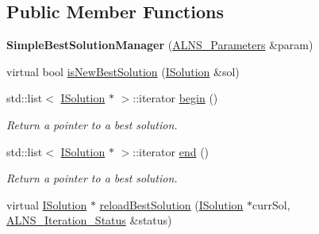 \subsection*{\-Public \-Member \-Functions}
\begin{DoxyCompactItemize}
\item 
\hypertarget{classSimpleBestSolutionManager_a776c41f8abf2720ecbdfea78d88b0f00}{{\bfseries \-Simple\-Best\-Solution\-Manager} (\hyperlink{classALNS__Parameters}{\-A\-L\-N\-S\-\_\-\-Parameters} \&param)}\label{classSimpleBestSolutionManager_a776c41f8abf2720ecbdfea78d88b0f00}

\item 
virtual bool \hyperlink{classSimpleBestSolutionManager_a8237e1d633717d3dc69c35ff5a88497a}{is\-New\-Best\-Solution} (\hyperlink{classISolution}{\-I\-Solution} \&sol)
\item 
\hypertarget{classSimpleBestSolutionManager_a3dda02789fdfd353d0759567d5514977}{std\-::list$<$ \hyperlink{classISolution}{\-I\-Solution} $\ast$ $>$\-::iterator \hyperlink{classSimpleBestSolutionManager_a3dda02789fdfd353d0759567d5514977}{begin} ()}\label{classSimpleBestSolutionManager_a3dda02789fdfd353d0759567d5514977}

\begin{DoxyCompactList}\small\item\em \-Return a pointer to a best solution. \end{DoxyCompactList}\item 
\hypertarget{classSimpleBestSolutionManager_a1c8934fa905385e6ba6570e694101e29}{std\-::list$<$ \hyperlink{classISolution}{\-I\-Solution} $\ast$ $>$\-::iterator \hyperlink{classSimpleBestSolutionManager_a1c8934fa905385e6ba6570e694101e29}{end} ()}\label{classSimpleBestSolutionManager_a1c8934fa905385e6ba6570e694101e29}

\begin{DoxyCompactList}\small\item\em \-Return a pointer to a best solution. \end{DoxyCompactList}\item 
virtual \hyperlink{classISolution}{\-I\-Solution} $\ast$ \hyperlink{classSimpleBestSolutionManager_ab65e6cbfff67aa80bab7c05c4c07f7a1}{reload\-Best\-Solution} (\hyperlink{classISolution}{\-I\-Solution} $\ast$curr\-Sol, \hyperlink{classALNS__Iteration__Status}{\-A\-L\-N\-S\-\_\-\-Iteration\-\_\-\-Status} \&status)
\end{DoxyCompactItemize}


